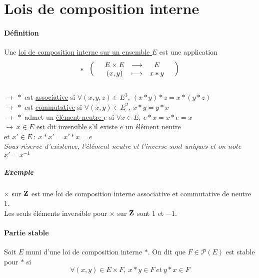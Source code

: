 

\minitoc
	\section{Lois de composition interne}
		\traitd
		\paragraph{Définition}
			Une \underline{loi de composition interne sur un ensemble $E$} est une application \\
			\[ * ~~ \appli{E\times E}{(x,y)}{E}{x*y}\] \vspace*{-0.7cm} \trait \vspace*{-0.8cm} \\ 
		\hspace*{2cm} $\rightarrow ~*$ est \underline{associative} si $\forall (x,y,z)\in E^3 ,~ (x*y)*z = x*(y*z)$ \\
		\hspace*{2cm} $\rightarrow ~*$ est \underline{commutative} si $\forall (x,y) \in E^2 ,~x*y = y*x$ \\
		\hspace*{2cm} $\rightarrow ~*$ admet un \underline{élément neutre $e$} si $\forall x\in E ,~e*x=x*e=x$ \\
		\hspace*{2cm} $\rightarrow ~x\in E$ est dit \underline{inversible} s'il existe $e$ un élément neutre \\ \hspace*{3cm} et $x'\in E 
		~:~x*x'=x'*x=e$ 
		\\ \textit{\small Sous réserve d'existence, l'élément neutre et l'inverse sont uniques et on note $x'=x^{-1}$}
		\subparagraph{Exemple} 
		{\small $\times $ sur $\Z$ est une loi de composition interne associative et commutative de neutre $1$. \\ Les seuls éléments inversible 
		pour $\times$ sur $\Z$ sont $1$ et $-1$. }
		\vspace*{0.5cm} \\  \traitd
		\paragraph{Partie stable}
			Soit $E$ muni d'une loi de composition interne $*$. On dit que $F\in\mathcal{P}(E)$ est stable pour $*$ si \[ \forall (x,y)\in 
			E\times F ,~x*y \in F ~et ~y*x\in F \] \vspace*{-0.7cm}\trait \vspace*{-1.5cm}

